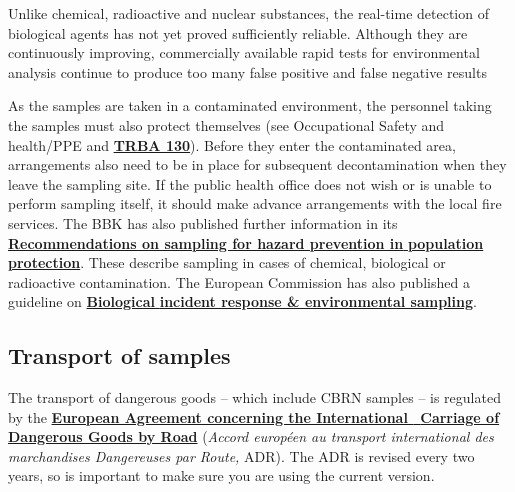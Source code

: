 \documentclass{article}
\begin{document}
Unlike chemical, radioactive and nuclear substances, the real-time detection of biological agents has not yet proved sufficiently reliable. Although they are continuously improving, commercially available rapid tests for environmental analysis continue to produce too many false positive and false negative results


As the samples are taken in a contaminated environment, the personnel taking the samples must also protect themselves (see Occupational Safety and health/PPE and \textbf{\href{https://www.baua.de/EN/Service/Legislative-texts-and-technical-rules/Rules/TRBA/TRBA-130.html}{TRBA 130}}). Before they enter the contaminated area, arrangements also need to be in place for subsequent decontamination when they leave the sampling site. If the public health office does not wish or is unable to perform sampling itself, it should make advance arrangements with the local fire services. The BBK has also published further information in its\textbf{ }\textbf{\href{https://www.bbk.bund.de/SharedDocs/Downloads/BBK/DE/Publikationen/PublikationenForschung/Fib_Band5_2teAuflage.pdf}{Recommendations on sampling for hazard prevention in}}\href{https://www.bbk.bund.de/SharedDocs/Downloads/BBK/DE/Publikationen/PublikationenForschung/Fib_Band5_2teAuflage.pdf}{ }\textbf{\href{https://www.bbk.bund.de/SharedDocs/Downloads/BBK/DE/Publikationen/PublikationenForschung/Fib_Band5_2teAuflage.pdf}{population protection}}. These describe sampling in cases of chemical,\textbf{ }biological or radioactive contamination. The European Commission has also published a guideline on \textbf{\href{https://ec.europa.eu/health/ph_threats/com/preparedness/docs/biological.pdf}{Biological}}\href{https://ec.europa.eu/health/ph_threats/com/preparedness/docs/biological.pdf}{ }\textbf{\href{https://ec.europa.eu/health/ph_threats/com/preparedness/docs/biological.pdf}{incident response \& environmental sampling}}.


\subsection{Transport of samples}\label{H4056301}



The transport of dangerous goods – which include CBRN samples – is regulated by the \textbf{\href{https://www.unece.org/trans/danger/publi/adr/adr2019/19contentse.html}{European Agreement concerning the International }}\href{https://www.unece.org/trans/danger/publi/adr/adr2019/19contentse.html}{ }\textbf{\href{https://www.unece.org/trans/danger/publi/adr/adr2019/19contentse.html}{Carriage of Dangerous Goods by Road}}\textbf{ }(\emph{Accord européen au transport international des marchandises Dangereuses par Route,} ADR). The ADR is revised every two years, so is important to make sure you are using the current version.
\end{document}
